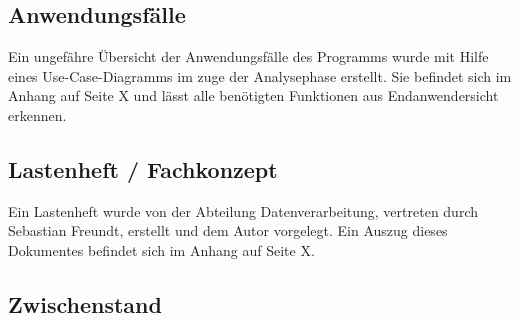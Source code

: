 \subsection{Anwendungsfälle}
Ein ungefähre Übersicht der Anwendungsfälle des Programms wurde mit Hilfe eines Use-Case-Diagramms
im zuge der Analysephase erstellt. Sie befindet sich im Anhang auf Seite X und lässt
alle benötigten Funktionen aus Endanwendersicht erkennen.\par

\subsection{Lastenheft / Fachkonzept}
Ein Lastenheft wurde von der Abteilung Datenverarbeitung, vertreten durch Sebastian Freundt,
erstellt und dem Autor vorgelegt. Ein Auszug dieses Dokumentes befindet sich im Anhang auf Seite X.\par


\subsection{Zwischenstand}
\clearpage